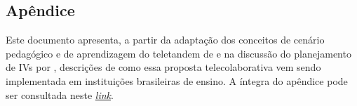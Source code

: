 \documentclass[portuguese]{textolivre}
\begin{document}
\printbibliography\label{sec-bib}

\subsection*{Apêndice}\label{apendice}
Este documento apresenta, a partir da adaptação dos conceitos de cenário pedagógico e de aprendizagem do teletandem de \textcite{aranha2017} e na discussão do planejamento de IVs por \textcite{rampazzamoore2024b}, descrições de como essa proposta telecolaborativa vem sendo implementada em instituições brasileiras de ensino. A íntegra do apêndice pode ser consultada neste \href{https://docs.google.com/document/d/1cVHzOuu7kBQe5CfekfkArf91Pd_Lgr8mlCRVzJWYmio/edit?usp=sharing}{\textit{link}}.
\end{document}
